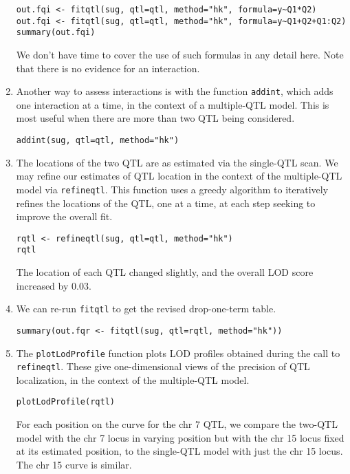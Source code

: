 \documentclass[10pt,letterpaper]{article}
\newcommand{\usercolor}{\color [named]{BlueViolet}}
\begin{document}
\begin{enumerate}
\usercolor
\verb|out.fqi <- fitqtl(sug, qtl=qtl, method="hk", formula=y~Q1*Q2)| \\
\verb|out.fqi <- fitqtl(sug, qtl=qtl, method="hk", formula=y~Q1+Q2+Q1:Q2)| \\
\verb|summary(out.fqi)|
\normalcolor

We don't have time to cover the use of such formulas in any detail
here.  Note that there is no evidence for an interaction.

\item Another way to assess interactions is with the function
  \verb-addint-, which adds one interaction at a time, in the context
  of a multiple-QTL model.  This is most useful when there are more
  than two QTL being considered.

\usercolor
\verb|addint(sug, qtl=qtl, method="hk")|
\normalcolor

\item The locations of the two QTL are as estimated via the single-QTL
  scan.  We may refine our estimates of QTL location in the context of
  the multiple-QTL model via \verb-refineqtl-.  This function
  uses a greedy algorithm to iteratively refines the locations of the
  QTL, one at a time, at each step seeking to improve the overall fit.

\usercolor
\verb|rqtl <- refineqtl(sug, qtl=qtl, method="hk")| \\
\verb|rqtl|
\normalcolor

The location of each QTL changed slightly, and the overall LOD score
increased by 0.03.

\item We can re-run \verb-fitqtl- to get the revised drop-one-term
  table.

\usercolor
\verb|summary(out.fqr <- fitqtl(sug, qtl=rqtl, method="hk"))|
\normalcolor

\item The \verb-plotLodProfile- function plots LOD profiles obtained
  during the call to \verb-refineqtl-.  These give one-dimensional
  views of the precision of QTL localization, in the context of the
  multiple-QTL model.

\usercolor
\verb|plotLodProfile(rqtl)|
\normalcolor

For each position on the curve for the chr 7 QTL, we compare the
two-QTL model with the chr 7 locus in varying position but with the
chr 15 locus fixed at its estimated position, to the single-QTL model
with just the chr 15 locus.  The chr 15 curve is similar.


\end{enumerate}
\end{document}
